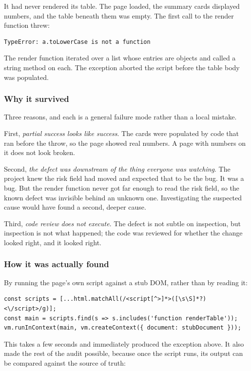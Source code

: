 It had never rendered its table. The page loaded, the summary cards displayed
numbers, and the table beneath them was empty. The first call to the render
function threw:

\begin{lstlisting}
TypeError: a.toLowerCase is not a function
\end{lstlisting}

The render function iterated over a list whose entries are objects and called a
string method on each. The exception aborted the script before the table body
was populated.

\subsubsection{Why it survived}

Three reasons, and each is a general failure mode rather than a local mistake.

First, \emph{partial success looks like success}. The cards were populated by
code that ran before the throw, so the page showed real numbers. A page with
numbers on it does not look broken.

Second, \emph{the defect was downstream of the thing everyone was watching}. The
project knew the risk field had moved and expected that to be the bug. It was a
bug. But the render function never got far enough to read the risk field, so the
known defect was invisible behind an unknown one. Investigating the suspected
cause would have found a second, deeper cause.

Third, \emph{code review does not execute}. The defect is not subtle on
inspection, but inspection is not what happened; the code was reviewed for
whether the change looked right, and it looked right.

\subsubsection{How it was actually found}

By running the page's own script against a stub DOM, rather than by reading it:

\begin{lstlisting}
const scripts = [...html.matchAll(/<script[^>]*>([\s\S]*?)<\/script>/g)];
const main = scripts.find(s => s.includes('function renderTable'));
vm.runInContext(main, vm.createContext({ document: stubDocument }));
\end{lstlisting}

This takes a few seconds and immediately produced the exception above. It also
made the rest of the audit possible, because once the script runs, its output can
be compared against the source of truth:

